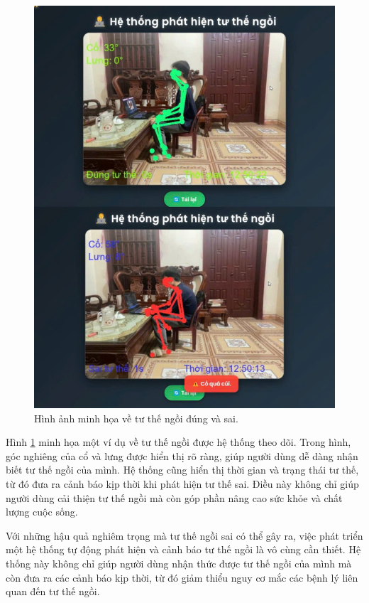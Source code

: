 \documentclass[conference]{IEEEtran}
\begin{document}
\begin{figure}[H]
    \centering
    \includegraphics[width=0.9\linewidth]{images/sitting_posture_example.png}
    \caption{Hình ảnh minh họa về tư thế ngồi đúng và sai.}
    \label{fig:posture_example}
\end{figure}

Hình \ref{fig:posture_example} minh họa một ví dụ về tư thế ngồi được hệ thống theo dõi. Trong hình, góc nghiêng của cổ và lưng được hiển thị rõ ràng, giúp người dùng dễ dàng nhận biết tư thế ngồi của mình. Hệ thống cũng hiển thị thời gian và trạng thái tư thế, từ đó đưa ra cảnh báo kịp thời khi phát hiện tư thế sai. Điều này không chỉ giúp người dùng cải thiện tư thế ngồi mà còn góp phần nâng cao sức khỏe và chất lượng cuộc sống.

Với những hậu quả nghiêm trọng mà tư thế ngồi sai có thể gây ra, việc phát triển một hệ thống tự động phát hiện và cảnh báo tư thế ngồi là vô cùng cần thiết. Hệ thống này không chỉ giúp người dùng nhận thức được tư thế ngồi của mình mà còn đưa ra các cảnh báo kịp thời, từ đó giảm thiểu nguy cơ mắc các bệnh lý liên quan đến tư thế ngồi.
\end{document}

